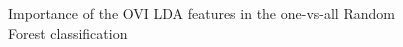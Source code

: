 \documentclass[twoside]{article}
\begin{document}
\begin{multicols}{2}
\begin{figure}[H]
\centering
{}
\quad
{}
\quad
{}
%
\caption{Importance of the OVI LDA features in the one-vs-all Random Forest classification}
\label{fig:figure}
\end{figure}


\end{multicols}
\end{document}
